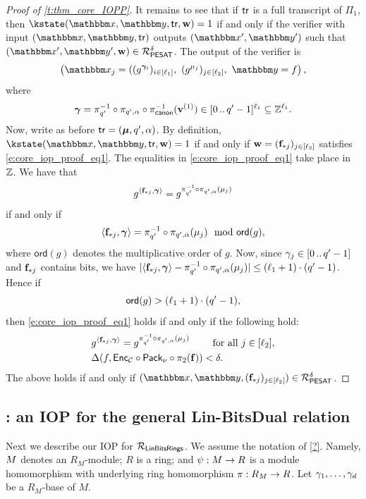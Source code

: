 \documentclass[11pt,letterpaper,usenames,dvipsnames]{article}
\begin{document}
\begin{proof}[Proof of \cref{t:thm_core_IOPP}]
It remains to see that if  $\mathsf{tr}$ is a full transcript of $\Pi_1$, then $\kstate(\inp,\oracle,\tr,\ww)=1$ if and only if the verifier with input $(\inp,\oracle, \tr)$ outputs $(\inp',\oracle')$ such that $(\inp',\oracle', \ww)\in \PESAT^{\delta}$. The output of the verifier is 
$$\left(\inp_j=((g^{\bm{\gamma}_i})_{i \in [\codedim_1]},\ (g^{\mu_j})_{j\in [\codedim_2]},\  \oracle= f \right),$$
%
where $$\bm{\gamma} = \pi_{q'}^{-1}\circ \pi_{q',\alpha}\circ \pi_{\mathsf{canon}}^{-1}(\mathbf{v}^{(1)}) \in [0 \, .. \, q'-1]^{\ell_1}\subseteq \mathbb{Z}^{\ell_1}.$$ Now, write as before $\mathsf{tr}=(\bm{\mu}, q', \alpha)$. By definition, $\kstate(\inp,\oracle,\tr,\ww)=1$ if and only if $\mathbf{w}=(\mathbf{f}_{*j})_{j\in [\ell_2]}$ satisfies \eqref{e:core_iop_proof_eq1}. 
The equalities in \eqref{e:core_iop_proof_eq1}  take place in $\mathbb{Z}$. We have that $$g^{\langle \mathbf{f}_{*j}, \bm{\gamma}\rangle} = g^{\pi_{q'}^{-1}\circ \pi_{q',\alpha}(\mu_j)}$$ if and only if $$\langle \mathbf{f}_{*j}, \bm{\gamma}\rangle = \pi_{q'}^{-1}\circ \pi_{q',\alpha}(\mu_j) \mod \mathsf{ord}(g),$$ where $\mathsf{ord}(g)$ denotes the multiplicative order of $g$. Now, since $\gamma_j\in [0 \, .. \, q'-1]$ and $\mathbf{f}_{*j}$ contains bits, we have $|\langle \mathbf{f}_{*j}, \bm{\gamma}\rangle - \pi_{q'}^{-1}\circ \pi_{q',\alpha}(\mu_j)| \leq (\ell_1+1) \cdot (q'-1)$. Hence if $$\mathsf{ord}(g) > (\ell_1+1) \cdot (q'-1),$$ then    \eqref{e:core_iop_proof_eq1}  holds if and only if the following hold:
%
\begin{equation*}
    \begin{aligned}
&g^{\langle \mathbf{f}_{*j}, \bm{\gamma}\rangle} = g^{\pi_{q'}^{-1}\circ \pi_{q',\alpha}(\mu_j)}\qquad \text{ for all } j\in [\ell_2], \\
& \Delta( f,\mathsf{Enc}_{\mathcal{C}}\circ \mathsf{Pack}_\nu\circ \pi_2(\mathbf{f})) < \delta.
\end{aligned}
\end{equation*}
%
The above holds if and only if $(\inp,\oracle, (\bff_{*j})_{j\in [\codedim_2]})\in \PESAT^\delta$.
%
\end{proof}





\subsection{\ftwoz: an IOP for the general Lin-BitsDual relation}

\renewcommand{\modulemorphism}{\psi}
\renewcommand{\moduletwo}{R}

Next we describe our IOP for $\mathcal{R}_{\mathsf{LinBitsRings}}$.  We assume the notation of \cref{?}. Namely, $M$ denotes an $R_M$-module; $R$ is a ring; and $\modulemorphism:\moduleone \to\moduletwo$ is a module homomorphism with underlying ring homomorphism $\pi:R_M \to R$.  Let $\gamma_1, \ldots, \gamma_d$ be a $R_M$-base of $M$. 
\end{document}
